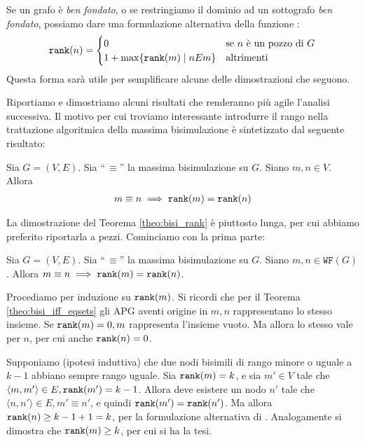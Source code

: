 Se un grafo è \emph{ben fondato}, o se restringiamo il dominio ad un sottografo \emph{ben fondato}, possiamo dare una formulazione alternativa della funzione \rankfunc:
\begin{gather*}
        \texttt{\textup{rank}}(n) = \begin{cases}
            0 &\text{se $n$ è un pozzo di $G$}\\
            1 + \max\{\texttt{\textup{rank}}(m) \mid n E m\} &\text{altrimenti}
        \end{cases}
\end{gather*}
Questa forma sarà utile per semplificare alcune delle dimostrazioni che seguono.

Riportiamo e dimostriamo alcuni risultati \cite{dovier} che renderanno più agile l'analisi successiva. Il motivo per cui troviamo interessante introdurre il rango nella trattazione algoritmica della massima bisimulazione è sintetizzato dal seguente risultato:
\begin{theorem}
    \label{theo:bisi_rank}
    Sia $G = (V,E)$. Sia ``\,$\equiv$'' la massima bisimulazione su $G$. Siano $m,n \in V$. Allora
    \begin{gather*}
        m \equiv n \implies \texttt{\textup{rank}}(m) = \texttt{\textup{rank}}(n)
    \end{gather*}
\end{theorem}
La dimostrazione del Teorema \ref{theo:bisi_rank} è piuttosto lunga, per cui abbiamo preferito riportarla a pezzi. Cominciamo con la prima parte:
\begin{proposition} \label{prop:rank_bisi_imp_wf}
    Sia $G = (V,E)$. Sia ``\,$\equiv$'' la massima bisimulazione su $G$. Siano $m,n \in \texttt{WF}(G)$. Allora $m \equiv n \implies \texttt{\textup{rank}}(m) = \texttt{\textup{rank}}(n)$.
\end{proposition}
\begin{proof2}
    Procediamo per induzione su $\texttt{\textup{rank}}(m)$. Si ricordi che per il Teorema \ref{theo:bisi_iff_eqsets} gli APG aventi origine in $m,n$ rappresentano lo stesso insieme. Se $\texttt{\textup{rank}}(m) = 0, m$ rappresenta l'insieme vuoto. Ma allora lo stesso vale per $n$, per cui anche $\texttt{\textup{rank}}(n) = 0$.

    Supponiamo (ipotesi induttiva) che due nodi bisimili di rango minore o uguale a $k-1$ abbiano sempre rango uguale. Sia $\texttt{\textup{rank}}(m) = k$, e sia $m' \in V$ tale che $\langle m, m'\rangle \in E, \texttt{\textup{rank}}(m') = k-1$. Allora deve esistere un nodo $n'$ tale che $\langle n, n'\rangle \in E, m' \equiv n'$, e quindi $\texttt{\textup{rank}}(m') = \texttt{\textup{rank}}(n')$. Ma allora $\texttt{\textup{rank}}(n) \geq k-1 + 1 = k$, per la formulazione alternativa di \rankfunc. Analogamente si dimostra che $\texttt{\textup{rank}}(m) \geq k$, per cui si ha la tesi.
\end{proof2}

